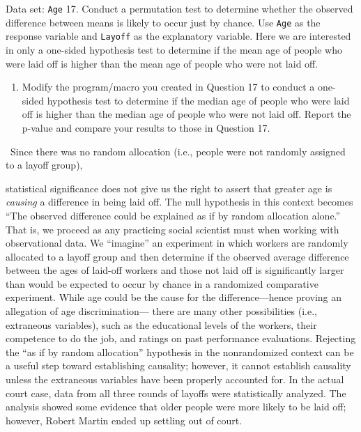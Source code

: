 \documentclass[
]{report}
\providecommand{\tightlist}{%
  \setlength{\itemsep}{0pt}\setlength{\parskip}{0pt}}
\theoremstyle{definition}
\theoremstyle{definition}
\theoremstyle{definition}
\theoremstyle{definition}
\theoremstyle{remark}
\begin{document}
Data set: \texttt{Age}
17. Conduct a permutation test to determine whether the observed difference between means is likely to
occur just by chance. Use \texttt{Age} as the response variable and \texttt{Layoff} as the explanatory variable. Here
we are interested in only a one-sided hypothesis test to determine if the mean age of people who were
laid off is higher than the mean age of people who were not laid off.

\begin{enumerate}
\def\labelenumi{\arabic{enumi}.}
\setcounter{enumi}{17}
\tightlist
\item
  Modify the program/macro you created in Question 17 to conduct a one-sided hypothesis test to determine
  if the median age of people who were laid off is higher than the median age of people who were
  not laid off. Report the p-value and compare your results to those in Question 17.
\end{enumerate}

~Since there was no random allocation (i.e., people were not randomly assigned to a layoff group),

statistical significance does not give us the right to assert that greater age is \emph{causing} a difference in being
laid off. The null hypothesis in this context becomes ``The observed difference could be explained as if
by random allocation alone.'' That is, we proceed as any practicing social scientist must when working
with observational data. We ``imagine'' an experiment in which workers are randomly allocated to a
layoff group and then determine if the observed average difference between the ages of laid-off workers
and those not laid off is significantly larger than would be expected to occur by chance in a randomized
comparative experiment.
\textbar{} While age could be the cause for the difference---hence proving an allegation of age discrimination---
there are many other possibilities (i.e., extraneous variables), such as the educational levels of the
workers, their competence to do the job, and ratings on past performance evaluations. Rejecting the
``as if by random allocation'' hypothesis in the nonrandomized context can be a useful step toward
establishing causality; however, it cannot establish causality unless the extraneous variables have been
properly accounted for.
\textbar{} In the actual court case, data from all three rounds of layoffs were statistically analyzed. The analysis
showed some evidence that older people were more likely to be laid off; however, Robert Martin ended up
settling out of court.
\end{document}
